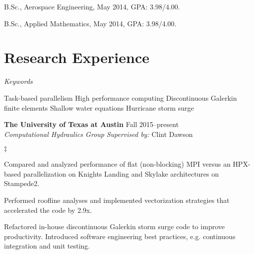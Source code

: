 \documentclass[margin,line]{res}
\newenvironment{list1}{
  \begin{list}{\ding{113}}{%
      \setlength{\itemsep}{0in}
      \setlength{\parsep}{0in} \setlength{\parskip}{0in}
      \setlength{\topsep}{0in} \setlength{\partopsep}{0in}
      \setlength{\leftmargin}{0.17in}}}{\end{list}}
\newenvironment{list2}{
  \begin{list}{$\ddagger$}{%
      \setlength{\itemsep}{0in}
      \setlength{\parsep}{0in} \setlength{\parskip}{0in}
      \setlength{\topsep}{0in} \setlength{\partopsep}{0in}
      \setlength{\leftmargin}{0.2in}}}{\end{list}}
\def\keywordgap{\hspace{2pt minus.5pt}}
\newcommand\keywordsep{\keywordgap\textbullet\keywordgap}
\begin{document}
\begin{resume}
\vspace*{-.1in}
\begin{list1}
\item[] B.Sc., Aerospace Engineering, May 2014, GPA: 3.98/4.00.
\item[] B.Sc., Applied Mathematics, May 2014, GPA: 3.98/4.00.
\end{list1}


\section{\sc Research Experience}
\textit{Keywords}
\vspace{0.05in}
\begin{list1}
\item[] Task-based parallelism \keywordsep High performance computing \keywordsep Discontinuous Galerkin finite elements \keywordsep Shallow water equations \keywordsep Hurricane storm surge
\end{list1}


\textbf{The University of Texas at Austin} \hfill Fall 2015--present\\
\textit{Computational Hydraulics Group}
\hfill {\it Supervised by:} Clint Dawson\\
\vspace{-0.1in}
\begin{list2}
\item Compared and analyzed performance of flat (non-blocking) MPI versus an HPX-based parallelization on Knights Landing and Skylake architectures on Stampede2.
\item Performed roofline analyses and implemented vectorization strategies that accelerated the code by 2.9x.
\item Refactored in-house discontinuous Galerkin storm surge code to improve productivity. Introduced software engineering best practices, e.g. continuous integration and unit testing.
\end{list2}


\end{resume}
\end{document}
